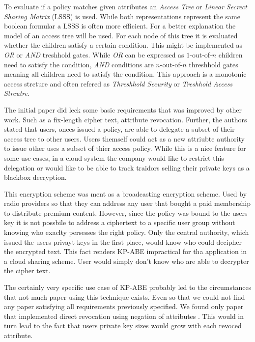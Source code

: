 To evaluate if a policy matches given attributes an \textit{Access Tree} or \textit{Linear Secrect Sharing Matrix} (LSSS) is used. While both representations represent the same boolean formular a LSSS is often more efficient. For a better explanation the model of an access tree will be used. For each node of this tree it is evaluated whether the children satisfy a certain condition. This might be implemented as \textit{OR} or \textit{AND} treshhold gates. While \textit{OR} can be expressed as $1$-out-of-$n$ children need to satisfy the condition, \textit{AND} conditions are $n$-out-of-$n$ threshhold gates meaning all children need to satisfy the condition. This approach is a monotonic access strcture and often refered as \textit{Threshhold Security} or \textit{Treshhold Access Strcutre}. 

The initial paper did leck some basic requirements that was improved by other work. Such as a fix-length cipher text, attribute revocation. Further, the authors stated that users, onces issued a policy, are able to delegate a subset of their access tree to other users. Users themself could act as a new attriubte authority to issue other uses a subset of thier access policy. While this is a nice feature for some use cases, in a cloud system the company would like to restrict this delegation or would like to be able to track traidors selling their private keys as a blackbox decryption.

This encryption scheme was ment as a broadcasting encryption scheme. Used by radio providers so that they can address any user that bought a paid membership to distribute premium content. However, since the policy was bound to the users key it is not possbile to address a ciphertext to a specific user group without knowing who exaclty persesses the right policy. Only the central authority, which issued the users privayt keys in the first place, would know who could decipher the encrypted text. This fact renders KP-ABE impractical for tha application in a cloud sharing scheme. User would simply don't know who are able to decrypter the cipher text. 

The certainly very specific use case of KP-ABE probably led to the circumstances that not much paper using this technique exists. Even so that we could not find any paper satisfying all requirements previously specified. We found only paper that implemented direct revocation using negation of attributes \cite{lewko2010revocation}. This would in turn lead to the fact that users private key sizes would grow with each revoced attribute. 

